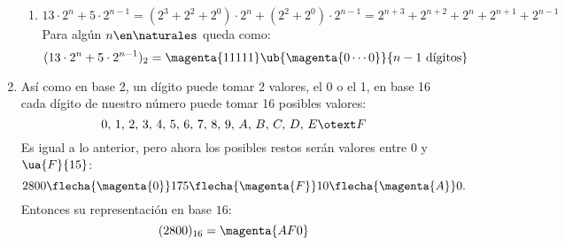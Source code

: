 \begin{enumerate}[label=(\alph*)]
\begin{enumerate}[label=\roman*.]
          \item $$
                  13 \cdot 2^n + 5 \cdot 2^{n - 1} =
                  (2^3 + 2^2 + 2^0) \cdot 2^n + (2^2 + 2^0) \cdot 2^{n - 1} =
                  2^{n + 3} + 2^{n + 2} + 2^n + 2^{n + 1} + 2^{n - 1}
                $$
                Para algún $n\en \naturales$ queda como:
                $$
                  (13 \cdot 2^n + 5 \cdot 2^{n - 1})_2 =
                  \magenta{11111}\ub{\magenta{0 \cdots 0}}{n - 1 \text{ dígitos}}
                $$
        \end{enumerate}
  \item Así como en base 2, un dígito puede tomar 2 valores, el 0 o el 1, en base 16 cada dígito de nuestro número puede tomar 16 posibles valores:
        $$
          0,\,1,\,2,\,3,\,4,\,5,\,6,\,7,\,8,\,9,\,A,\,B,\,C,\,D,\,E \otext F
        $$
        Es igual a lo anterior, pero ahora los posibles restos serán valores entre $0$ y $\ua{F}{15}$:
        $$
          2800 \flecha{\magenta{0}} 175 \flecha{\magenta{F}} 10 \flecha{\magenta{A}} 0.
        $$
        Entonces su representación en base $16$:
        $$
          (2800)_{16} = \magenta{AF0}
        $$
\end{enumerate}

\begin{aportes}
  \item {}
  \item {}
\end{aportes}
